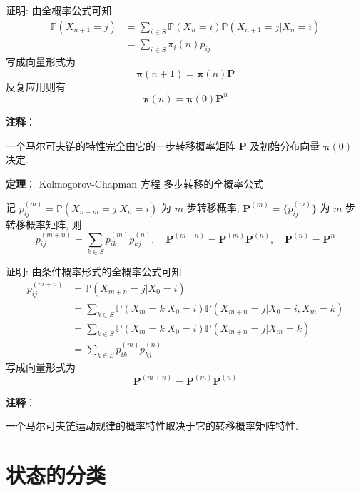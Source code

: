 \documentclass[openany]{ctexbook}
\theoremstyle{kaiti}
\theoremstyle{normal}
\begin{document}
证明: 由全概率公式可知
\begin{equation}
  \begin{aligned}
    \mathbb{P}(X_{n+1}=j)&=\sum_{i\in S}\mathbb{P}(X_n=i)\mathbb{P}(X_{n+1}=j|X_n=i)\\
    &=\sum_{i\in S} \pi_i(n)p_{ij}
  \end{aligned}
\end{equation} 写成向量形式为
\begin{equation}
  \bm{\pi}(n+1)=\bm{\pi}(n)\bm{P}
\end{equation} 反复应用则有
\begin{equation}
  \bm{\pi}(n)=\bm{\pi}(0)\bm{P}^n
\end{equation}

\textbf{注释}：

一个马尔可夫链的特性完全由它的一步转移概率矩阵 $\bm{P}$ 及初始分布向量 $\bm{\pi}(0)$ 决定.

\textbf{定理}： Kolmogorov-Chapman 方程 多步转移的全概率公式

记 $p_{ij}^{(m)}=\mathbb{P}(X_{n+m}=j|X_n=i)$ 为 $m$ 步转移概率, $\bm{P}^{(m)}=\{p_{ij}^{(m)}\}$ 为 $m$ 步转移概率矩阵, 则 
\begin{equation}
  p_{ij}^{(m+n)}=\sum_{k\in S}p_{ik}^{(m)}p_{kj}^{(n)},\quad \bm{P}^{(m+n)}=\bm{P}^{(m)}\bm{P}^{(n)},\quad \bm{P}^{(n)}=\bm{P}^n
\end{equation}

证明: 由条件概率形式的全概率公式可知
\begin{equation}
  \begin{aligned}
    p_{ij}^{(m+n)}&=\mathbb{P}(X_{m+n}=j|X_0=i)\\
    &=\sum_{k\in S}\mathbb{P}(X_m=k|X_0=i)\mathbb{P}(X_{m+n}=j|X_0=i,X_m=k)\\
    &=\sum_{k\in S}\mathbb{P}(X_m=k|X_0=i)\mathbb{P}(X_{m+n}=j|X_m=k)\\
    &=\sum_{k\in S} p_{ik}^{(m)}p_{kj}^{(n)}
  \end{aligned}
\end{equation} 写成向量形式为
\begin{equation}
  \bm{P}^{(m+n)}=\bm{P}^{(m)}\bm{P}^{(n)}
\end{equation}

\textbf{注释}：

一个马尔可夫链运动规律的概率特性取决于它的转移概率矩阵特性.

\section{状态的分类}
\end{document}
